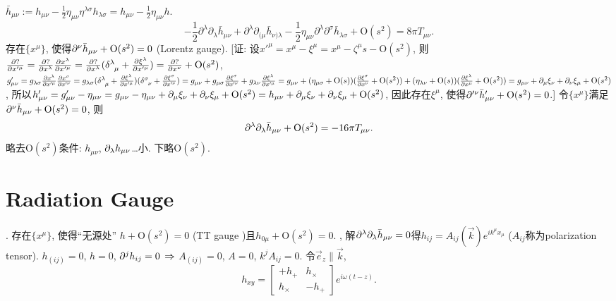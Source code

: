 $\bar{h}_{\mu\nu}:=h_{\mu\nu}-\frac{1}{2}\eta_{\mu\nu}\eta^{\lambda\sigma}h_{\lambda\sigma}=h_{\mu\nu}-\frac{1}{2}\eta_{\mu\nu}h$.
\begin{equation}
    -\frac{1}{2} \partial^{\lambda} \partial_{\lambda} \bar{h}_{\mu \nu}+\partial^{\lambda} \partial_{(\mu} \bar{h}_{\nu) \lambda}-\frac{1}{2} \eta_{\mu \nu} \partial^{\lambda} \partial^{\sigma} \bar{h}_{\lambda \sigma}+\text{O}(s^2)=8 \pi T_{\mu \nu}.
\end{equation}
存在$\{x^{\mu}\}$, 使得$\partial^{\nu}\bar{h}_{\mu\nu}+\text{O}(s^2)=0$ (Lorentz gauge). [证: 设$x'^\mu=x^\mu-\xi^\mu=x^\mu-\zeta^\mu s-\text{O}(s^2)$, 则$\frac{\p ?}{\p x'^\mu}=\frac{\p ?}{\p x^\lambda}\frac{\p x^\lambda}{\p x'^\mu}=\frac{\p ?}{\p x^\lambda}(\delta^{\lambda}_{\ph{\lambda}\mu}+\frac{\p \xi^\lambda}{\p x'^\mu})=\frac{\p ?}{\p x^\nu}+\text{O}(s^2)$, $g'_{\mu\nu}=g_{\lambda\sigma}\frac{\p x^\lambda}{\p x'^\mu}\frac{\p x^\sigma}{\p x'^\nu}=g_{\lambda\sigma}(\delta^{\lambda}_{\ph{\lambda}\mu}+\frac{\p \xi^\lambda}{\p x'^\mu})(\delta^{\sigma}_{\ph{\sigma}\nu}+\frac{\p \xi^\sigma}{\p x'^\nu})=g_{\mu\nu}+g_{\mu\sigma}\frac{\p \xi^\sigma}{\p x'^\nu}+g_{\lambda\nu}\frac{\p \xi^\lambda}{\p x'^\mu}=g_{\mu\nu}+(\eta_{\mu\sigma}+\text{O}(s))(\frac{\p \xi^\sigma}{\p x^\nu}+\text{O}(s^2))+(\eta_{\lambda\nu}+\text{O}(s))(\frac{\p \xi^\lambda}{\p x^\mu}+\text{O}(s^2))=g_{\mu\nu}+\p_\mu\xi_\nu+\p_\nu\xi_\mu+\text{O}(s^2)$, 所以$h'_{\mu\nu}=g'_{\mu\nu}-\eta_{\mu\nu}=g_{\mu\nu}-\eta_{\mu\nu}+\partial_\mu\xi_\nu+\partial_\nu\xi_\mu+\text{O}(s^2)=h_{\mu\nu}+\partial_\mu\xi_\nu+\partial_\nu\xi_\mu+\text{O}(s^2)$, 因此存在$\xi^\mu$, 使得$\partial'^{\nu}\bar{h}'_{\mu\nu}+\text{O}(s^2)=0$.] 令$\{x^{\mu}\}$满足$\partial^{\nu}\bar{h}_{\mu\nu}+\text{O}(s^2)=0$, 则
\begin{equation}
    \partial^{\lambda}\partial_{\lambda}\bar{h}_{\mu\nu}+\text{O}(s^2)=-16\pi T_{\mu \nu}.\label{lin_gravity}
\end{equation}
略去$\text{O}(s^2)$条件: $h_{\mu\nu}$, $\partial_\lambda h_{\mu\nu}$\dots{}小. 下略$\text{O}(s^2)$. 

\section{Radiation Gauge}

\cite{Wald1984}. 存在$\{x^{\mu}\}$, 使得``无源处'' $h+\text{O}(s^2)=0$ (TT gauge \cite{Wang2020})且$h_{0\mu}+\text{O}(s^2)=0$. \cite{Maggiore2014}, 解$\partial^{\lambda}\partial_{\lambda}\bar{h}_{\mu\nu}=0$得$h_{ij}=A_{ij}(\vec{k})e^{ik^\mu x_\mu}$ ($A_{ij}$称为polarization tensor). $h_{(ij)}=0$, $h=0$, $\partial^{j}h_{ij}=0$ $\Rightarrow$ $A_{(ij)}=0$, $A=0$, $k^{j}A_{ij}=0$. 令$\vec{e}_z\parallel\vec{k}$,
\begin{equation}
    h_{xy}=\begin{bmatrix}
        +h_+&h_\times\\
        h_\times&-h_+
    \end{bmatrix}e^{i\omega(t-z)}.
\end{equation}

